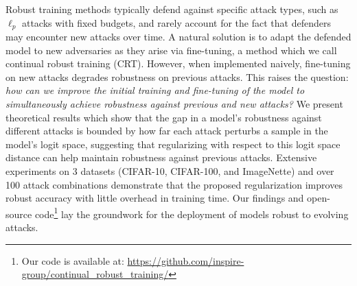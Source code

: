 Robust training methods typically defend against specific attack types, such as $\ell_p$ attacks with fixed budgets, and rarely account for the fact that defenders may encounter new attacks over time.  A natural solution is to adapt the defended model to new adversaries as they arise via fine-tuning, a method which we call continual robust training (CRT).  However, when implemented naively, fine-tuning on new attacks degrades robustness on previous attacks.  This raises the question: \textit{how can we improve the initial training and fine-tuning of the model to simultaneously achieve robustness against previous and new attacks?} We present theoretical results which show that the gap in a model's robustness against different attacks is bounded by how far each attack perturbs a sample in the model's logit space, suggesting that regularizing with respect to this logit space distance can help maintain robustness against previous attacks.
Extensive experiments on 3 datasets (CIFAR-10, CIFAR-100, and ImageNette) and over 100 attack combinations demonstrate that the proposed regularization improves robust accuracy with little overhead in training time. Our findings and open-source code\footnote{Our code is available at: \url{https://github.com/inspire-group/continual_robust_training/}} lay the groundwork for the deployment of models robust to evolving attacks.

